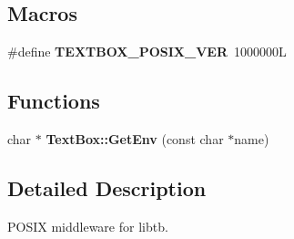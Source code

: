 \subsection*{Macros}
\begin{DoxyCompactItemize}
\item 
\mbox{\label{a00008_ad98b2c7915913a840ba875c845dfa070}} 
\#define {\bfseries T\+E\+X\+T\+B\+O\+X\+\_\+\+P\+O\+S\+I\+X\+\_\+\+V\+ER}~1000000L
\end{DoxyCompactItemize}
\subsection*{Functions}
\begin{DoxyCompactItemize}
\item 
\mbox{\label{a00008_aecf0f98513dc0747679b055932e56968}} 
char $\ast$ {\bfseries Text\+Box\+::\+Get\+Env} (const char $\ast$name)
\end{DoxyCompactItemize}


\subsection{Detailed Description}
P\+O\+S\+IX middleware for libtb. 

